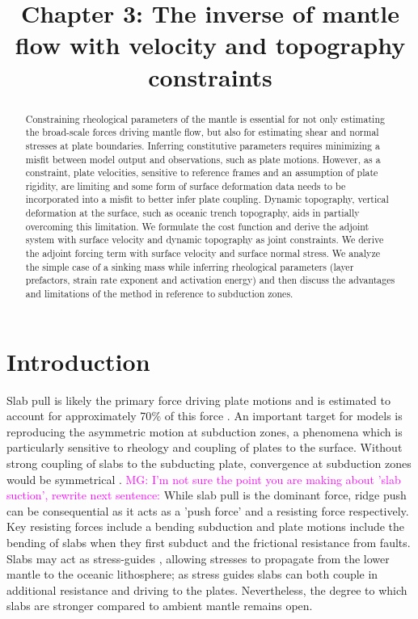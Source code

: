 \documentclass[12pt]{article}
\title{Chapter 3: The inverse of mantle flow with velocity and topography constraints}
\newcommand{\mgnote}[1]{\textcolor{magenta}{MG: #1}}
\begin{document}
\maketitle

\begin{abstract}
Constraining rheological parameters of the mantle is essential for not only estimating the broad-scale forces driving mantle flow, but also for estimating shear and normal stresses at plate boundaries. Inferring constitutive parameters requires minimizing a misfit between model output and observations, such as plate motions. However, as a constraint, plate velocities, sensitive to reference frames and an assumption of plate rigidity, are limiting and some form of surface deformation data needs to be incorporated into a misfit to better infer plate coupling. Dynamic topography, vertical deformation at the surface, such as oceanic trench topography, aids in partially overcoming this limitation. We formulate the cost function and derive the adjoint system with surface velocity and dynamic topography as joint constraints. We derive the adjoint forcing term with surface velocity and surface normal stress. We analyze the simple case of a sinking mass while inferring rheological parameters (layer prefactors, strain rate exponent and activation energy) and then discuss the advantages and limitations of the method in reference to subduction zones. 

\end{abstract}

\section*{Introduction}
  Slab pull is likely the primary force driving plate motions \citep{Forsyth01101975,JGR13769} and is estimated to account for approximately 70$\%$ of this force \citep{Conrad04102002}. An important target for models is reproducing the asymmetric motion at subduction zones, a phenomena which is particularly sensitive to rheology and coupling of plates to the surface. Without strong coupling of slabs to the subducting plate, convergence at subduction zones would be symmetrical \citep{Conrad04102002}. \mgnote{I'm not sure the point you are making about 'slab suction', rewrite next sentence:} While slab pull is the dominant force, ridge push can be consequential as it acts as a 'push force' and a resisting force respectively. Key resisting forces include a bending subduction and plate motions include the bending of slabs when they first subduct and the frictional resistance from faults.  Slabs may act as stress-guides \citep{Stadler27082010}, allowing stresses to propagate from the lower mantle to the oceanic lithosphere; as stress guides slabs can both couple in additional resistance and driving to the plates. Nevertheless, the degree to which slabs are stronger compared to ambient mantle remains open. 
  
\end{document}
